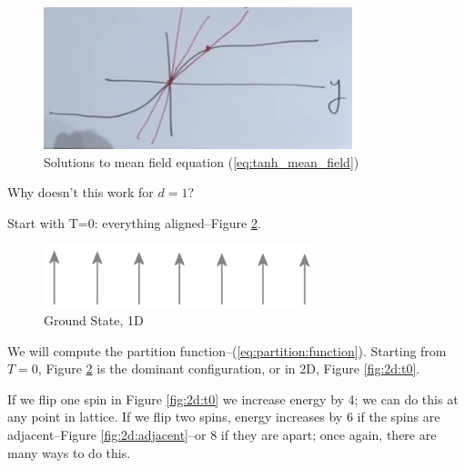 \documentclass[]{article}
\begin{document}
\begin{figure}[H]
	\caption{Solutions to mean field equation (\ref{eq:tanh_mean_field})}\label{fig:tanh_mean_field}
	\includegraphics[width=0.8\textwidth]{tanh_mean_field}
\end{figure}

Why doesn't this work for $d=1$?

Start with T=0: everything aligned--Figure \ref{fig:T:zero:aligned}.

\begin{figure}[H]
	\centering
	\caption{Ground State, 1D}\label{fig:T:zero:aligned}
	\includegraphics[width=0.7\textwidth]{T_zero_aligned}
\end{figure}

 We will compute the partition function--(\ref{eq:partition:function}). Starting from $T=0$, Figure \ref{fig:T:zero:aligned} is the dominant configuration, or in 2D, Figure \ref{fig:2d:t0}.
 
 If we flip one spin in Figure \ref{fig:2d:t0} we increase energy by 4; we can do this at any point in lattice. If we flip two spins, energy increases by 6 if the spins are adjacent--Figure \ref{fig:2d:adjacent}--or 8 if they are apart; once again, there are many ways to do this.
  
\end{document}
